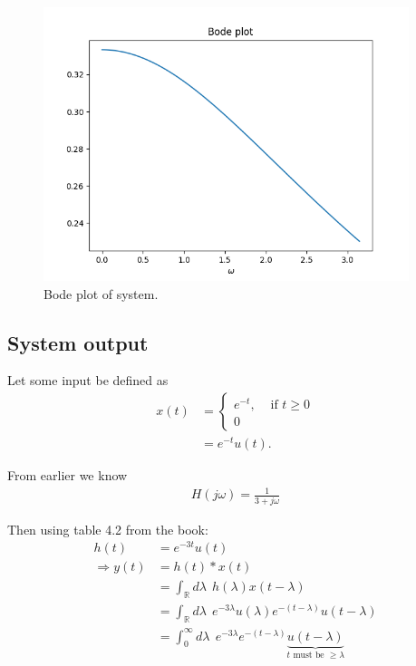 \begin{figure}[h!]
    \begin{center}
        \includegraphics[width=0.95\textwidth]{figures/p3_bode.png}
    \end{center}
    \caption{Bode plot of system.}
\end{figure}

\subsection*{System output}
Let some input be defined as 
\begin{align}
    x(t) &= \begin{cases}
        e^{-t}, &\text{ if }t\geq 0\\
        0        
    \end{cases}\\ 
        &= e^{-t}u(t).
\end{align}

From earlier we know
\begin{align}
    H(j\omega) = \frac{1}{3 + j\omega}
\end{align}

Then using table 4.2 from the book:
\begin{align}
    h(t) &= e^{-3t}u(t)\\
\Rightarrow y(t) &= h(t)*x(t)\\ 
    &= \int_\mathbb{R}d\lambda \ \ h(\lambda)x(t-\lambda)\\ 
    &= \int_\mathbb{R}d\lambda \ \ e^{-3\lambda}u(\lambda)
        e^{-(t-\lambda)}u(t-\lambda)\\ 
    &= \int_0^\infty d\lambda \ \ e^{-3\lambda}
        e^{-(t-\lambda)}\underbrace{u(t-\lambda)}
        _{\text{$t$ must be $\geq \lambda$}}\\ 
\end{align}

